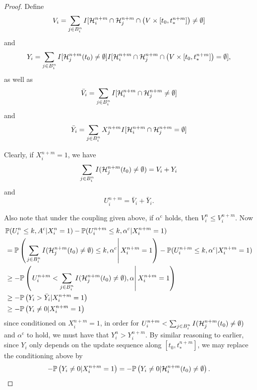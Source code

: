 \begin{proof}
		Define
		\begin{equation}
			V_i = \sum_{j \in B_i^n} I [\mathcal{H}_i^{n+m} \cap \mathcal{H}_j^{n+m} \cap \left(V \times [t_0, t_*^{n+m}] \right) \neq \emptyset]
		\end{equation}
		and
		\begin{equation}
			Y_i = \sum_{j \in B_i^n} I[\mathcal{H}_j^{n+m}(t_0) \neq \emptyset] I [\mathcal{H}_i^{n+m} \cap \mathcal{H}_j^{n+m} \cap \left(V \times [t_0, t_*^{n+m}] \right) = \emptyset],
		\end{equation}
		as well as 
		\begin{equation}
			\bar{V}_i = \sum_{j \in B_i^n} I [\mathcal{H}_i^{n+m} \cap \mathcal{H}_j^{n+m}  \neq \emptyset]
		\end{equation}
		and
		\begin{equation}
			\bar{Y}_i = \sum_{j \in B_i^n} X_j^{n+m}  I [\mathcal{H}_i^{n+m} \cap \mathcal{H}_j^{n+m} = \emptyset]
		\end{equation}

		Clearly, if $X_i^{n+m} = 1$, we have
		\begin{equation}
			\sum_{j \in B_i^n} I(\mathcal{H}_j^{n+m}(t_0) \neq \emptyset) = V_i + Y_i
		\end{equation}
		and
		\begin{equation}
			U_i^{n+m} = \bar{V}_i + \bar{Y}_i.
		\end{equation}

		Also note that under the coupling given above, if $\alpha^\mathrm{c}$ holds, then $V_i^n \leq V_i^{n+m}$. Now
		\begin{align}
			&\mathbb{P}(U_i^n \leq k, A^\mathrm{c} | X_i^n = 1) - \mathbb{P}(U_i^{n+m} \leq k, \alpha^\mathrm{c} | X_i^{n+m} = 1) \\
			&= \mathbb{P}\left(\left.\sum_{j \in B_i^n} I(\mathcal{H}_j^{n+m}(t_0) \neq \emptyset) \leq k, \alpha^\mathrm{c} \right| X_i^{n+m} = 1 \right) - \mathbb{P}(U_i^{n+m} \leq k, \alpha^\mathrm{c} | X_i^{n+m} = 1)\\
			&\geq -\mathbb{P}\left( \left. U_i^{n+m} < \sum_{j \in B_i^n} I(\mathcal{H}_j^{n+m}(t_0) \neq \emptyset), \alpha \right| X_i^{n+m} = 1\right)\\
			&\geq -\mathbb{P}\left(Y_i > \bar{Y}_i | X_i^{n+m} = 1 \right)\\
			&\geq -\mathbb{P}\left(Y_i \neq 0 | X_i^{n+m} = 1 \right)
		\end{align}
		since conditioned on $X_i^{n+m} = 1$, in order for $U_i^{n+m} < \sum_{j \in B_i^n} I(\mathcal{H}_j^{n+m}(t_0) \neq \emptyset)$ and $\alpha^\mathrm{c}$ to hold, we must have that $Y_i^n > Y_i^{n+m}$. By similar reasoning to earlier, since $Y_i$ only depends on the update sequence along $[t_0, t_*^{n+m}]$, we may replace the conditioning above by
		\begin{align}
			-\mathbb{P}\left(Y_i \neq 0 | X_i^{n+m} = 1 \right) = -\mathbb{P}\left(Y_i \neq 0 | \mathcal{H}_i^{n+m}(t_0) \neq \emptyset \right).
		\end{align}


\end{proof}
